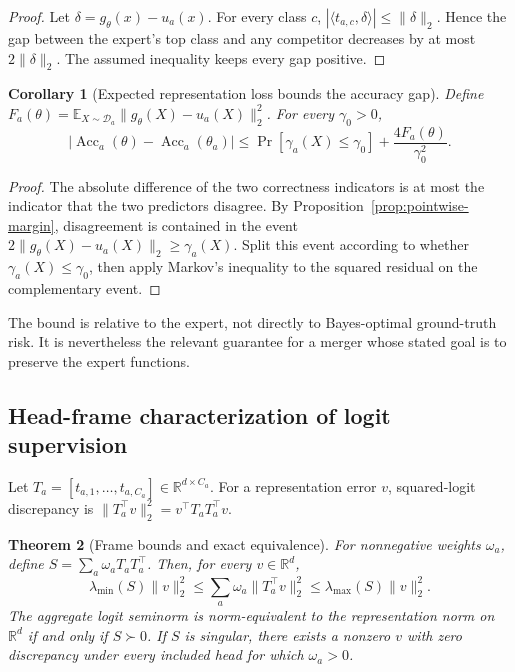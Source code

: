 \documentclass[letterpaper]{article} %
\theoremstyle{plain}
\newtheorem{theorem}{Theorem}
\newtheorem{corollary}[theorem]{Corollary}
\theoremstyle{definition}
\begin{document}
\begin{proof}
Let $\delta=g_\theta(x)-u_a(x)$. For every class $c$,
$|\langle t_{a,c},\delta\rangle|\le\|\delta\|_2$. Hence the gap between the expert's top
class and any competitor decreases by at most $2\|\delta\|_2$. The assumed inequality
keeps every gap positive.
\end{proof}

\begin{corollary}[Expected representation loss bounds the accuracy gap]
\label{cor:accuracy-gap}
Define
$F_a(\theta)=\mathbb E_{X\sim\mathcal D_a}
\|g_\theta(X)-u_a(X)\|_2^2$. For every $\gamma_0>0$,
\begin{equation}
\left|\operatorname{Acc}_a(\theta)-\operatorname{Acc}_a(\theta_a)\right|
\le
\Pr[\gamma_a(X)\le\gamma_0]
+\frac{4F_a(\theta)}{\gamma_0^2}.
\label{eq:accuracy-gap}
\end{equation}
\end{corollary}

\begin{proof}
The absolute difference of the two correctness indicators is at most the indicator that
the two predictors disagree. By Proposition~\ref{prop:pointwise-margin}, disagreement
is contained in the event $2\|g_\theta(X)-u_a(X)\|_2\ge\gamma_a(X)$. Split this event
according to whether $\gamma_a(X)\le\gamma_0$, then apply Markov's inequality to the
squared residual on the complementary event.
\end{proof}

The bound is relative to the expert, not directly to Bayes-optimal ground-truth risk. It
is nevertheless the relevant guarantee for a merger whose stated goal is to preserve the
expert functions.

\subsection{Head-frame characterization of logit supervision}
\label{app:head-frame}

Let $T_a=[t_{a,1},\ldots,t_{a,C_a}]\in\mathbb R^{d\times C_a}$. For a representation
error $v$, squared-logit discrepancy is
$\|T_a^\top v\|_2^2=v^\top T_aT_a^\top v$.

\begin{theorem}[Frame bounds and exact equivalence]
\label{thm:frame}
For nonnegative weights $\omega_a$, define
$S=\sum_a\omega_aT_aT_a^\top$. Then, for every $v\in\mathbb R^d$,
\begin{equation}
\lambda_{\min}(S)\|v\|_2^2
\le\sum_a\omega_a\|T_a^\top v\|_2^2
\le\lambda_{\max}(S)\|v\|_2^2.
\label{eq:frame-bounds}
\end{equation}
The aggregate logit seminorm is norm-equivalent to the representation norm on
$\mathbb R^d$ if and only if $S\succ0$. If $S$ is singular, there exists a nonzero $v$
with zero discrepancy under every included head for which $\omega_a>0$.
\end{theorem}
\end{document}
